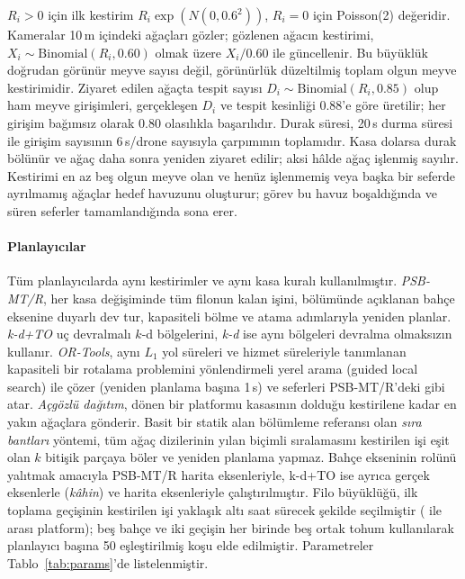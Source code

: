 $R_i>0$ için ilk kestirim $R_i\exp(N(0,0.6^2))$, $R_i=0$ için Poisson(2)
değeridir. Kameralar 10\,m içindeki ağaçları gözler; gözlenen ağacın kestirimi,
$X_i\sim\mathrm{Binomial}(R_i,0.60)$ olmak üzere $X_i/0.60$ ile güncellenir.
Bu büyüklük doğrudan görünür meyve sayısı değil, görünürlük düzeltilmiş toplam
olgun meyve kestirimidir. Ziyaret edilen ağaçta tespit sayısı
$D_i\sim\mathrm{Binomial}(R_i,0.85)$ olup ham meyve girişimleri, gerçekleşen
$D_i$ ve tespit kesinliği 0.88'e göre üretilir; her girişim bağımsız olarak 0.80
olasılıkla başarılıdır. Durak süresi, 20\,s durma süresi ile girişim sayısının
6\,s/drone sayısıyla çarpımının toplamıdır. Kasa dolarsa durak bölünür ve ağaç
daha sonra yeniden ziyaret edilir; aksi hâlde ağaç işlenmiş sayılır. Kestirimi en
az beş olgun meyve olan ve henüz işlenmemiş veya başka bir seferde ayrılmamış
ağaçlar hedef havuzunu oluşturur; görev bu havuz boşaldığında ve süren seferler
tamamlandığında sona erer.

\paragraph{Planlayıcılar} Tüm planlayıcılarda aynı kestirimler ve aynı kasa kuralı kullanılmıştır.
\emph{PSB-MT/R}, her kasa değişiminde tüm filonun kalan işini,  bölümünde açıklanan
bahçe eksenine duyarlı dev tur, kapasiteli bölme ve atama adımlarıyla yeniden planlar.
\emph{k-d+TO} uç devralmalı $k$-d bölgelerini, \emph{k-d} ise aynı bölgeleri devralma
olmaksızın kullanır. \emph{OR-Tools}, aynı $L_1$ yol süreleri ve hizmet süreleriyle tanımlanan
kapasiteli bir rotalama problemini yönlendirmeli yerel arama (guided local search) ile
çözer (yeniden planlama başına 1\,s) ve seferleri PSB-MT/R'deki gibi atar.
\emph{Açgözlü dağıtım}, dönen bir platformu kasasının dolduğu kestirilene kadar en yakın
ağaçlara gönderir. Basit bir statik alan bölümleme referansı olan \emph{sıra bantları}
yöntemi, tüm ağaç dizilerinin yılan biçimli sıralamasını kestirilen işi eşit olan
$k$ bitişik parçaya böler ve yeniden planlama yapmaz. Bahçe ekseninin rolünü
yalıtmak amacıyla PSB-MT/R harita eksenleriyle, k-d+TO ise ayrıca gerçek eksenlerle
(\emph{kâhin}) ve harita eksenleriyle çalıştırılmıştır.
Filo büyüklüğü, ilk toplama geçişinin kestirilen işi yaklaşık altı saat sürecek şekilde
seçilmiştir (\HgKMin{} ile \HgKMax{} arası platform); beş bahçe ve iki geçişin her
birinde beş ortak tohum kullanılarak planlayıcı başına 50 eşleştirilmiş koşu elde
edilmiştir. Parametreler Tablo~\ref{tab:params}'de listelenmiştir.

